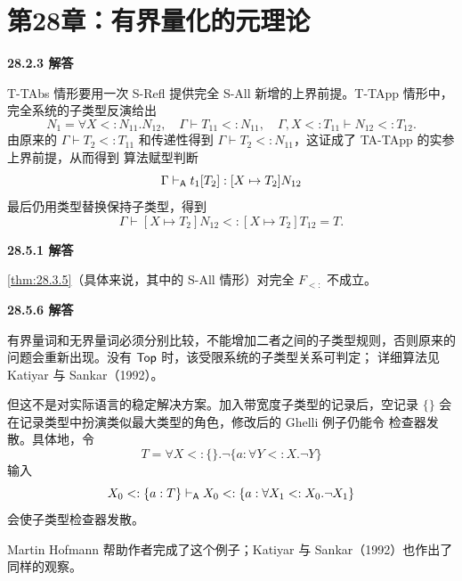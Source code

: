 \newpage
\section{第28章：有界量化的元理论}

\begin{taplauthorsolutionentrybox}
\label{sol:author:28.2.3}
\textbf{28.2.3 解答}

T-TAbs 情形要用一次 S-Refl 提供完全 S-All 新增的上界前提。T-TApp 情形中，
完全系统的子类型反演给出
\[
N_1=\forall X<:N_{11}.N_{12},
\quad
\Gamma\vdash T_{11}<:N_{11},
\quad
\Gamma,X<:T_{11}\vdash N_{12}<:T_{12}.
\]
由原来的 \(\Gamma\vdash T_2<:T_{11}\) 和传递性得到
\(\Gamma\vdash T_2<:N_{11}\)，这证成了 TA-TApp 的实参上界前提，从而得到
算法赋型判断
\[
\Gamma\mathrel{\vdash_{\mathsf A}} t_1[T_2]:[X\mapsto T_2]N_{12}
\]
最后仍用类型替换保持子类型，得到
\[
\Gamma\vdash[X\mapsto T_2]N_{12}<:[X\mapsto T_2]T_{12}=T.
\]
\end{taplauthorsolutionentrybox}

\begin{taplauthorsolutionentrybox}
\label{sol:author:28.5.1}
\textbf{28.5.1 解答}

\cref{thm:28.3.5}（具体来说，其中的 S-All 情形）对完全 \(F_{<:}\) 不成立。
\end{taplauthorsolutionentrybox}

\begin{taplauthorsolutionentrybox}
\label{sol:author:28.5.6}
\textbf{28.5.6 解答}

有界量词和无界量词必须分别比较，不能增加二者之间的子类型规则，否则原来的
问题会重新出现。没有 \(\mathsf{Top}\) 时，该受限系统的子类型关系可判定；
详细算法见 Katiyar 与 Sankar（1992）。

但这不是对实际语言的稳定解决方案。加入带宽度子类型的记录后，空记录
\(\{\}\) 会在记录类型中扮演类似最大类型的角色，修改后的 Ghelli 例子仍能令
检查器发散。具体地，令
\[
T=\forall X<:\{\}.\neg\{a:\forall Y<:X.\neg Y\}
\]
输入
\[
X_0<:\{a:T\}\mathrel{\vdash_{\mathsf A}}
X_0<:\{a:\forall X_1<:X_0.\neg X_1\}
\]
会使子类型检查器发散。

Martin Hofmann 帮助作者完成了这个例子；Katiyar 与 Sankar（1992）也作出了
同样的观察。
\end{taplauthorsolutionentrybox}

